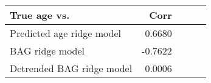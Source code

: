 \begin{tabular}{lrrrr}
\toprule
             True age vs. &    Corr \\
\midrule
Predicted age ridge model &  0.6680 \\
          BAG ridge model & -0.7622 \\
Detrended BAG ridge model &  0.0006 \\
\bottomrule
\end{tabular}
